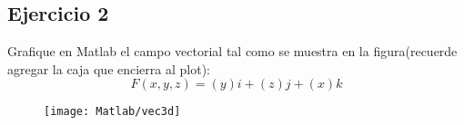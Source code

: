 \subsection{Ejercicio 2}
Grafique en Matlab el campo vectorial  tal como se muestra en la figura(recuerde agregar la caja que encierra al plot):
\begin{equation}
	F(x,y,z)= (y)i +(z)j+ (x)k
\end{equation}
\begin{figure}[h]
	\centering
	\texttt{[image: Matlab/vec3d]}
	\label{fig:vec3d}
\end{figure}
